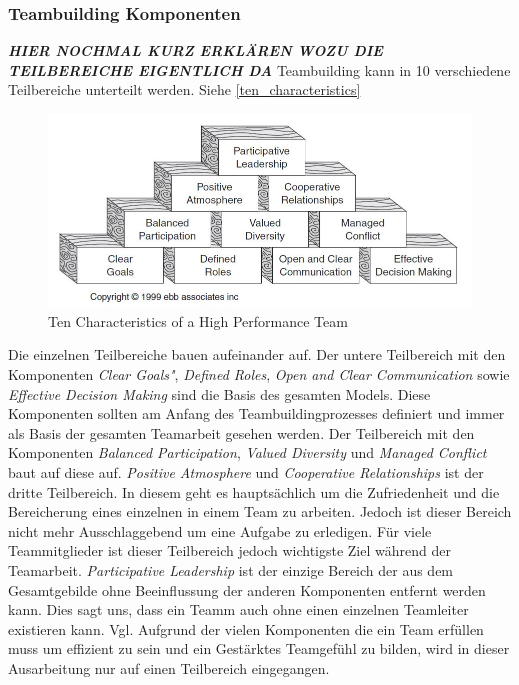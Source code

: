 \documentclass[a4paper,11pt]{article}%
\renewcommand{\\}{\vspace*{0.5\baselineskip} \newline}
\begin{document}
	
		\subsubsection{Teambuilding Komponenten}
	\textit{\textbf{HIER NOCHMAL KURZ ERKLÄREN WOZU DIE TEILBEREICHE EIGENTLICH DA}}
	Teambuilding kann in 10 verschiedene Teilbereiche unterteilt werden. Siehe \autoref{ten_characteristics}
	\begin{figure}[H]
		\begin{footnotesize}
			\includegraphics[width=\textwidth]{Abbildungen/Ten_Characteristics.JPG}
			\caption[Abbildung 1]{Ten Characteristics of a High Performance Team \citep[p. 27]{biech2007pfeiffer}}
			\label{ten_characteristics}
		\end{footnotesize}
	\end{figure}
	Die einzelnen Teilbereiche bauen aufeinander auf. Der untere Teilbereich mit den Komponenten \textit{Clear Goals"}, \textit{Defined Roles}, \textit{Open and Clear Communication} sowie \textit{Effective Decision Making} sind die Basis des gesamten Models. Diese Komponenten sollten am Anfang des Teambuildingprozesses definiert und immer als Basis der gesamten Teamarbeit gesehen werden.\\
	Der Teilbereich mit den Komponenten \textit{Balanced Participation}, \textit{Valued Diversity} und \textit{Managed Conflict} baut auf diese auf.\\
	\textit{Positive Atmosphere} und \textit{Cooperative Relationships} ist der dritte Teilbereich. In diesem geht es hauptsächlich um die Zufriedenheit und die Bereicherung eines einzelnen in einem Team zu arbeiten. Jedoch ist dieser Bereich nicht mehr Ausschlaggebend um eine Aufgabe zu erledigen. Für viele Teammitglieder ist dieser Teilbereich jedoch wichtigste Ziel während der Teamarbeit.\\
	\textit{Participative Leadership} ist der einzige Bereich der aus dem Gesamtgebilde ohne Beeinflussung der anderen Komponenten entfernt werden kann. Dies sagt uns, dass ein Teamm auch ohne einen einzelnen Teamleiter existieren kann. Vgl. \citep[p. 13-16]{biech2007pfeiffer}\\
	Aufgrund der vielen Komponenten die ein Team erfüllen muss um effizient zu sein und ein Gestärktes Teamgefühl zu bilden, wird in dieser Ausarbeitung nur auf einen Teilbereich eingegangen.
	
\end{document}
